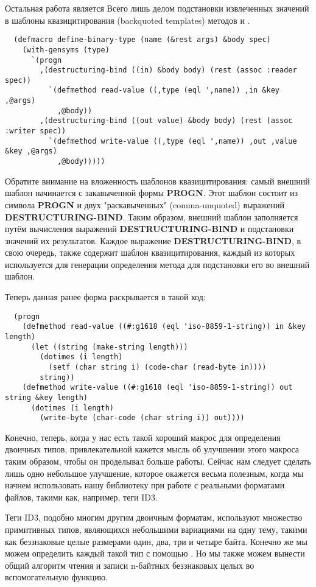 Остальная работа является Всего лишь делом подстановки извлеченных значений в шаблоны
квазицитирования (backquoted templates) методов  и .

\begin{lstlisting}
  (defmacro define-binary-type (name (&rest args) &body spec)
    (with-gensyms (type)
      `(progn
        ,(destructuring-bind ((in) &body body) (rest (assoc :reader spec))
          `(defmethod read-value ((,type (eql ',name)) ,in &key ,@args)
            ,@body))
        ,(destructuring-bind ((out value) &body body) (rest (assoc :writer spec))
          `(defmethod write-value ((,type (eql ',name)) ,out ,value &key ,@args)
            ,@body)))))
\end{lstlisting}

Обратите внимание на вложенность шаблонов квазицитирования: самый внешний шаблон начинается с закавыченной формы \textbf{PROGN}. Этот шаблон состоит из символа \textbf{PROGN} и двух "раскавыченных" (comma-unquoted) выражений \textbf{DESTRUCTURING-BIND}. Таким образом, внешний шаблон заполняется путём вычисления выражений \textbf{DESTRUCTURING-BIND} и подстановки значений их результатов. Каждое выражение \textbf{DESTRUCTURING-BIND}, в свою очередь, также содержит шаблон квазицитирования, каждый из которых используется для генерации определения метода для подстановки его во внешний шаблон.

Теперь данная ранее форма  раскрывается в такой код:

\begin{lstlisting}
  (progn
    (defmethod read-value ((#:g1618 (eql 'iso-8859-1-string)) in &key length)
      (let ((string (make-string length)))
        (dotimes (i length)
          (setf (char string i) (code-char (read-byte in))))
        string))
    (defmethod write-value ((#:g1618 (eql 'iso-8859-1-string)) out string &key length)
      (dotimes (i length)
        (write-byte (char-code (char string i)) out))))
\end{lstlisting}

Конечно, теперь, когда у нас есть такой хороший макрос для определения двоичных типов,
привлекательной кажется мысль об улучшении этого макроса таким образом, чтобы он
проделывал больше работы. Сейчас нам следует сделать лишь одно небольшое улучшение,
которое окажется весьма полезным, когда мы начнем использовать нашу библиотеку при работе
с реальными форматами файлов, такими как, например, теги ID3.

Теги ID3, подобно многим другим двоичным форматам, используют множество примитивных типов,
являющихся небольшими вариациями на одну тему, такими как беззнаковые целые размерами
один, два, три и четыре байта. Конечно же мы можем определить каждый такой тип с помощью
. Но мы также можем вынести общий алгоритм чтения и записи
n-байтных беззнаковых целых во вспомогательную функцию.

